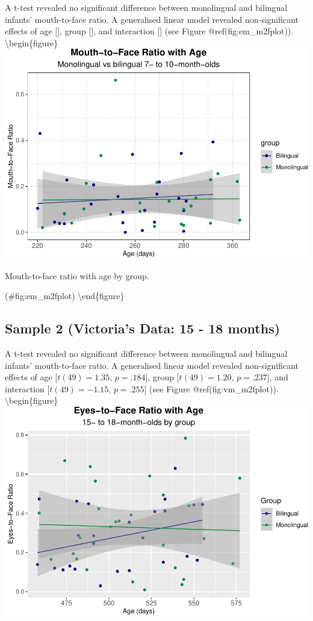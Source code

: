 \documentclass[english,man,floatsintext]{apa6}
\begin{document}
A t-test revealed no significant difference between monolingual and bilingual infants' mouth-to-face ratio. A generalised linear model revealed non-significant effects of age {[}{]}, group {[}{]}, and interaction {[}{]} (see Figure @ref(fig:em\_m2fplot)).
\textbackslash{}begin\{figure\}
\includegraphics{Effects_of_early_language_experience_on_infants_files/figure-latex/em_m2fplot-1}

\caption{Mouth-to-face ratio with age by group.}

(\#fig:em\_m2fplot)
\textbackslash{}end\{figure\}

\hypertarget{sample-2-victorias-data-15---18-months-4}{%
\subsection{Sample 2 (Victoria's Data: 15 - 18 months)}\label{sample-2-victorias-data-15---18-months-4}}

A t-test revealed no significant difference between monolingual and bilingual infants' mouth-to-face ratio. A generalised linear model revealed non-significant effects of age {[}\(t(49) = 1.35\), \(p = .184\){]}, group {[}\(t(49) = 1.20\), \(p = .237\){]}, and interaction {[}\(t(49) = -1.15\), \(p = .255\){]} (see Figure @ref(fig:vm\_m2fplot)).
\textbackslash{}begin\{figure\}
\includegraphics{Effects_of_early_language_experience_on_infants_files/figure-latex/vm_m2fplot-1}
\end{document}
